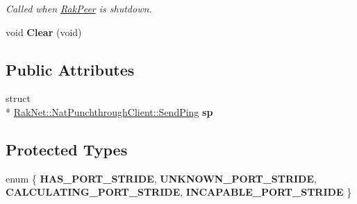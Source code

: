 \begin{DoxyCompactItemize}
\begin{DoxyCompactList}\small\item\em Called when \hyperlink{class_rak_net_1_1_rak_peer}{Rak\-Peer} is shutdown. \end{DoxyCompactList}\item 
\hypertarget{class_rak_net_1_1_nat_punchthrough_client_a61a4f659a4a6e5235443d92202ab1b46}{void {\bfseries Clear} (void)}\label{class_rak_net_1_1_nat_punchthrough_client_a61a4f659a4a6e5235443d92202ab1b46}

\end{DoxyCompactItemize}
\subsection*{Public Attributes}
\begin{DoxyCompactItemize}
\item 
\hypertarget{class_rak_net_1_1_nat_punchthrough_client_a0d48fd9e340ffdef814f21b479783d7c}{struct \\*
\hyperlink{struct_rak_net_1_1_nat_punchthrough_client_1_1_send_ping}{Rak\-Net\-::\-Nat\-Punchthrough\-Client\-::\-Send\-Ping} {\bfseries sp}}\label{class_rak_net_1_1_nat_punchthrough_client_a0d48fd9e340ffdef814f21b479783d7c}

\end{DoxyCompactItemize}
\subsection*{Protected Types}
\begin{DoxyCompactItemize}
\item 
enum \{ {\bfseries H\-A\-S\-\_\-\-P\-O\-R\-T\-\_\-\-S\-T\-R\-I\-D\-E}, 
{\bfseries U\-N\-K\-N\-O\-W\-N\-\_\-\-P\-O\-R\-T\-\_\-\-S\-T\-R\-I\-D\-E}, 
{\bfseries C\-A\-L\-C\-U\-L\-A\-T\-I\-N\-G\-\_\-\-P\-O\-R\-T\-\_\-\-S\-T\-R\-I\-D\-E}, 
{\bfseries I\-N\-C\-A\-P\-A\-B\-L\-E\-\_\-\-P\-O\-R\-T\-\_\-\-S\-T\-R\-I\-D\-E}
 \}
\end{DoxyCompactItemize}
